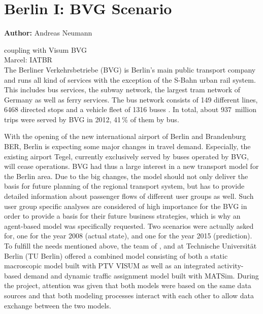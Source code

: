 \section{Berlin I: BVG Scenario}
\label{ch:scenarios:berlinI}
\hfill \textbf{Author:} Andreas Neumann

\citep[][p.67ff]{Balmer_PhDThesis_2007}

coupling with Visum BVG \\
Marcel: IATBR \\


The Berliner Verkehrsbetriebe (BVG) is Berlin's main public transport company
and runs all kind of services with the exception of the S-Bahn urban rail
system. This includes bus services, the subway network, the largest tram network
of Germany as well as ferry services. The bus network consists of 149
different lines, 6468 directed stops and a vehicle fleet of 1316 buses \citep{BVG2012}.
In total, about 937~million trips were served by BVG in 2012,
41\,\% of them by bus.

With the opening of the new international airport of Berlin and Brandenburg BER,
Berlin is expecting some major changes in travel demand. Especially, the
existing airport Tegel, currently exclusively served by buses operated by BVG,
will cease operations. BVG had thus a large interest in a new transport model
for the Berlin area. Due to the big changes, the model should not only deliver
the basis for future planning of the regional transport system, but has to
provide detailed information about passenger flows of different user groups as
well. Such user group specific analyses are considered of high importance for
the BVG in order to provide a basis for their future business strategies, which
is why an agent-based model was specifically requested. Two scenarios were
actually asked for, one for the year 2008 (actual state), and one for the year
2015 (prediction). To fulfill the needs mentioned above, the team of 
\citet{PTV2013}, \citet{Senozon2013} and \citet{VSP2013} at Technische Universit{\"a}t Berlin (TU Berlin)
offered a combined model consisting of both a static macroscopic model built with
PTV VISUM \citep{VISUM2013} as well as an integrated activity-based demand and
dynamic traffic assignment model built with MATSim. During
the project, attention was given that both models were based on the same data
sources and that both modeling processes interact with each other to allow data
exchange between the two models.


